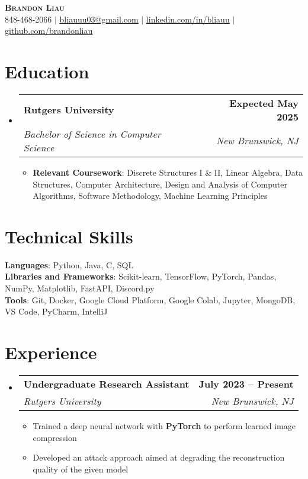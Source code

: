 \documentclass[letterpaper,11pt]{article}
\makeatletter
\newcommand{\resumeItem}[1]{
  \item\small{
    {#1 \vspace{-2pt}}
  }
}
\newcommand{\resumeSubheading}[4]{
  \vspace{-2pt}\item
    \begin{tabular*}{0.97\textwidth}[t]{l@{\extracolsep{\fill}}r}
      \textbf{#1} & #2 \\
      \textit{\small#3} & \textit{\small #4} \\
    \end{tabular*}\vspace{-7pt}
}
\newcommand{\resumeSubHeadingListStart}{\begin{itemize}[leftmargin=0.15in, label={}]}
\newcommand{\resumeSubHeadingListEnd}{\end{itemize}}
\newcommand{\resumeItemListStart}{\begin{itemize}}
\newcommand{\resumeItemListEnd}{\end{itemize}\vspace{-3pt}}
\makeatother
\begin{document}
\begin{center}
    \textbf{\Huge \scshape Brandon Liau} \\ \vspace{8pt}
    \small {} 848-468-2066 $|$ 
    \href{mailto:x@x.com}{ \underline{bliauuu03@gmail.com}} $|$ 
    \href{https://linkedin.com/in/bliauu}{ \underline{linkedin.com/in/bliauu}} $|$
    \href{https://github.com/brandonliau}{ \underline{github.com/brandonliau}}
\end{center}


\section{Education}
  \resumeSubHeadingListStart
    \resumeSubheading
      {Rutgers University}{\textbf{Expected May 2025}}
      {Bachelor of Science in Computer Science}{New Brunswick, NJ}
      \resumeItemListStart
        \resumeItem{\textbf{Relevant Coursework}: Discrete Structures I \& II, Linear Algebra, Data Structures, Computer Architecture, Design and Analysis of Computer Algorithms, Software Methodology, Machine Learning Principles}
      \resumeItemListEnd
  \resumeSubHeadingListEnd


\section{Technical Skills}
 \begin{itemize}[leftmargin=0.15in, label={}]
    \small{\item{
     \textbf{Languages}{: Python, Java, C, SQL} \vspace{1.5pt}\\
     \textbf{Libraries and Frameworks}{: Scikit-learn, TensorFlow, PyTorch, Pandas, NumPy, Matplotlib, FastAPI, Discord.py} \vspace{1.5pt}\\
     \textbf{Tools}{: Git, Docker, Google Cloud Platform, Google Colab, Jupyter, MongoDB, VS Code, PyCharm, IntelliJ} \\
    }}
 \end{itemize}


\section{Experience}
  \resumeSubHeadingListStart
    \resumeSubheading
      {Undergraduate Research Assistant}{\textbf{July 2023 -- Present}}
      {Rutgers University}{New Brunswick, NJ}
      \resumeItemListStart
        \resumeItem{Trained a deep neural network with \textbf{PyTorch} to perform learned image compression}
        \resumeItem{Developed an attack approach aimed at degrading the reconstruction quality of the given model}
      \resumeItemListEnd
  \resumeSubHeadingListEnd
\end{document}
